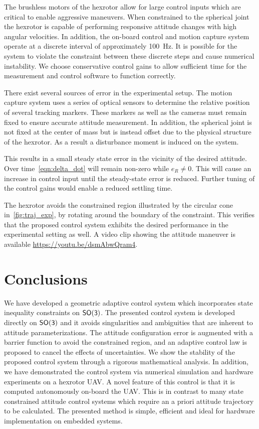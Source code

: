 \documentclass[letterpaper, 10 pt, conference]{ieeeconf}  %
\begin{document}
The brushless motors of the hexrotor allow for large control inputs which are critical to enable aggressive maneuvers. 
When constrained to the spherical joint the hexrotor is capable of performing responsive attitude changes with high angular velocities.
In addition, the on-board control and motion capture system operate at a discrete interval of approximately \SI{100}{\hertz}.
It is possible for the system to violate the constraint between these discrete steps and cause numerical instability.
We choose conservative control gains to  allow sufficient time for the measurement and control software to function correctly.

There exist several sources of error in the experimental setup.
The motion capture system uses a series of optical sensors to determine the relative position of several tracking markers. 
These markers as well as the cameras must remain fixed to ensure accurate attitude measurement.
In addition, the spherical joint is not fixed at the center of mass but is instead offset due to the physical structure of the hexrotor.
As a result a disturbance moment is induced on the system.

This results in a small steady state error in the vicinity of the desired attitude. 
Over time~\cref{eqn:delta_dot} will remain non-zero while \( e_R \neq 0 \).
This will cause an increase in control input until the steady-state error is reduced. 
Further tuning of the control gains would enable a reduced settling time.

The hexrotor avoids the constrained region illustrated by the circular cone in~\cref{fig:traj_exp}, by rotating around the boundary of the constraint. 
This verifies that the proposed control system exhibits the desired performance in the experimental setting as well. 
A video clip showing the attitude maneuver is available \url{https://youtu.be/dsmAbwQram4}.
\section{Conclusions}\label{sec:conclusions}
We have developed a geometric adaptive control system which incorporates state inequality constraints on \(\mathsf{SO(3)}\).
The presented control system is developed directly on \(\mathsf{SO(3)}\) and it avoids singularities and ambiguities that are inherent to attitude parameterizations.
The attitude configuration error is augmented with a barrier function to avoid the constrained region, and an adaptive control law is proposed to cancel the effects of uncertainties. 
We show the stability of the  proposed control system through a rigorous mathematical analysis.
In addition, we have demonstrated the control system via numerical simulation and hardware experiments on a hexrotor UAV.
A novel feature of this control is that it is computed autonomously on-board the UAV.
This is in contrast to many state constrained attitude control systems which require an a priori attitude trajectory to be calculated. 
The presented method is simple, efficient and ideal for hardware implementation on embedded systems.





\addtolength{\textheight}{-12cm}   
                                  


\end{document}
